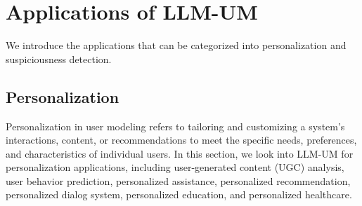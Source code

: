 \documentclass[11pt]{article}
\begin{document}
\section{Applications of LLM-UM}
\label{sec:application}
We introduce the applications that can be categorized into personalization and suspiciousness detection. 


\subsection{Personalization}
\label{sec:app_personalization}
Personalization in user modeling refers to tailoring and customizing a system's interactions, content, or recommendations to meet the specific needs, preferences, and characteristics of individual users. In this section, we look into LLM-UM for personalization applications, including user-generated content (UGC) analysis, user behavior prediction, personalized assistance, personalized recommendation, personalized dialog system, personalized education, and personalized healthcare.





\end{document}
